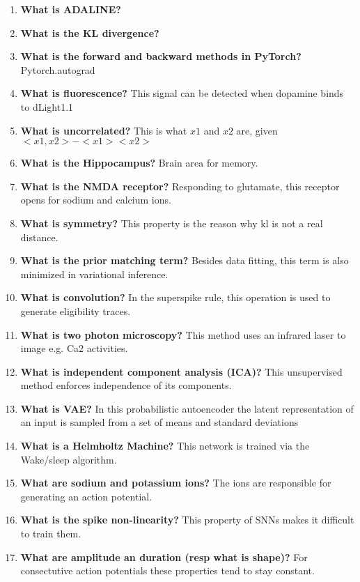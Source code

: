 \documentclass[main]{subfiles}
\begin{document}
\begin{enumerate}
    \item \textbf{What is ADALINE?}
    
    \item \textbf{What is the KL divergence?}
    
    \item \textbf{What is the forward and backward methods in PyTorch?}
    Pytorch.autograd
    \item \textbf{What is fluorescence?}
    This signal can be detected when dopamine binds to dLight1.1
    \item \textbf{What is uncorrelated?}
    This is what $x1$ and $x2$ are, given $<x1,x2> - <x1><x2>$
    \item \textbf{What is the Hippocampus?} 
    Brain area for memory.
    \item \textbf{What is the NMDA receptor?}
    Responding to glutamate, this receptor opens for sodium and calcium ions.
    \item \textbf{What is symmetry?}
    This property is the reason why kl is not a real distance.
    \item \textbf{What is the prior matching term?}
    Besides data fitting, this term is also minimized in variational inference.
    \item \textbf{What is convolution?}
    In the superspike rule, this operation is used to generate eligibility traces.
    \item \textbf{What is two photon microscopy?}
    This method uses an infrared laser to image e.g. Ca2 activities.
    \item \textbf{What is independent component analysis (ICA)?}
    This unsupervised method enforces independence of its components.
    \item \textbf{What is VAE?}
    In this probabilistic autoencoder the latent representation of an input is sampled from a set of means and standard deviations
    \item \textbf{What is a Helmholtz Machine?}
    This network is trained via the Wake/sleep algorithm.
    \item \textbf{What are sodium and potassium ions?}
    The ions are responsible for generating an action potential.
    \item \textbf{What is the spike non-linearity?}
    This property of SNNs makes it difficult to train them.
    \item \textbf{What are amplitude an duration (resp what is shape)?}
    For consectutive action potentials these properties tend to stay constant.

\end{enumerate}
\end{document}
